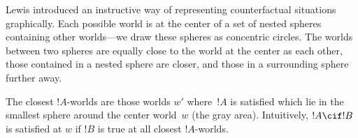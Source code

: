 \documentclass[../../../include/open-logic-section]{subfiles}
\begin{document}
Lewis introduced an instructive way of representing counterfactual
situations graphically. Each possible world is at the center of a set
of nested spheres containing other worlds---we draw these spheres as
concentric circles. The worlds between two spheres are equally close
to the world at the center as each other, those contained in a nested
sphere are closer, and those in a surrounding sphere further away.
\begin{center}
\end{center}
The closest $!A$-worlds are those worlds $w'$ where~$!A$ is satisfied
which lie in the smallest sphere around the center world~$w$ (the gray
area). Intuitively, $!A \cif !B$ is satisfied at $w$ if $!B$ is true
at all closest $!A$-worlds.
\end{document}
